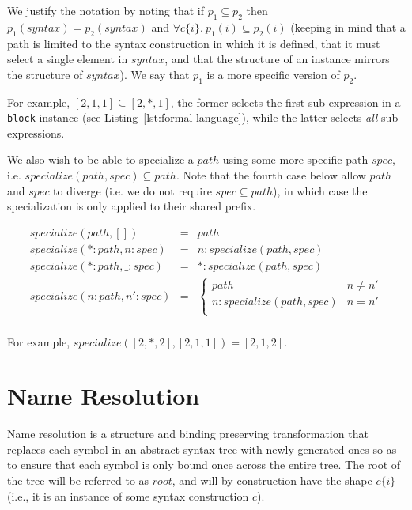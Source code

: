 \documentclass{kththesis}
\begin{document}
We justify the notation by noting that if $p_1 \subseteq p_2$ then $p_1(syntax) = p_2(syntax)$ and $\forall c\{i\}.\ p_1(i) \subseteq p_2(i)$ (keeping in mind that a path is limited to the syntax construction in which it is defined, that it must select a single  element in $syntax$, and that the structure of an instance mirrors the structure of $syntax$). We say that $p_1$ is a more specific version of $p_2$.

For example, $[2, 1, 1] \subseteq [2, *, 1]$, the former selects the first sub-expression in a \texttt{block} instance (see Listing~\ref{lst:formal-language}), while the latter selects \emph{all} sub-expressions.

\newcommand{\specialize}{\ensuremath{\mathit{specialize}}}

We also wish to be able to specialize a $path$ using some more specific path $spec$, i.e. $\specialize(path, spec) \subseteq path$. Note that the fourth case below allow $path$ and $spec$ to diverge (i.e. we do not require $spec \subseteq path$), in which case the specialization is only applied to their shared prefix.

$$
\begin{array}{rcl}
\specialize(path, []) & = & path \\
\specialize(*:path, n:spec) & = & n : \specialize(path, spec) \\
\specialize(*:path, \_:spec) & = & * : \specialize(path, spec) \\
\specialize(n:path, n':spec) & = &
\begin{cases}
  path & n \neq n' \\
  n : \specialize(path, spec) & n = n' \\
\end{cases} \\
\end{array}
$$

For example, $\specialize([2, *, 2], [2, 1, 1]) = [2, 1, 2]$.

\section{Name Resolution} \label{sec:name-resolution}

\newcommand{\rooti}{\ensuremath{\mathit{root}}}

Name resolution is a structure and binding preserving transformation that replaces each symbol in an abstract syntax tree with newly generated ones so as to ensure that each symbol is only bound once across the entire tree. The root of the tree will be referred to as \rooti, and will by construction have the shape $c\{i\}$ (i.e., it is an instance of some syntax construction $c$).
\end{document}
